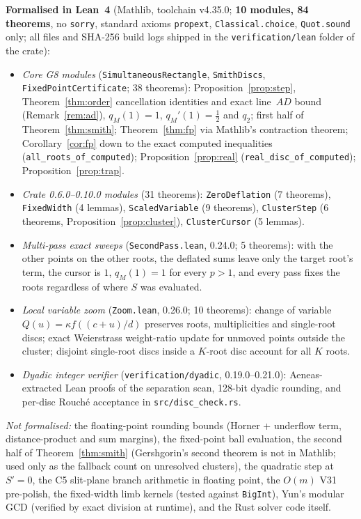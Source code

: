 \documentclass[10pt,a4paper]{article}
\theoremstyle{definition}
\numberwithin{equation}{section}
\begin{document}
\textbf{Formalised in Lean~4} (Mathlib, toolchain v4.35.0; \textbf{10 modules, 84 theorems}, no \texttt{sorry}, standard axioms \texttt{propext}, \texttt{Classical.choice}, \texttt{Quot.sound} only; all files and SHA-256 build logs shipped in the \texttt{verification/lean} folder of the crate):
\begin{itemize}
\item \emph{Core G8 modules} (\texttt{SimultaneousRectangle}, \texttt{SmithDiscs}, \texttt{FixedPointCertificate}; 38 theorems): Proposition~\ref{prop:step}, Theorem~\ref{thm:order} cancellation identities and exact line~$AD$ bound (Remark~\ref{rem:ad}), $q_M(1)=1$, $q_M'(1)=\frac12$ and $q_2$; first half of Theorem~\ref{thm:smith}; Theorem~\ref{thm:fp} via Mathlib's contraction theorem; Corollary~\ref{cor:fp} down to the exact computed inequalities (\texttt{all\_roots\_of\_computed}); Proposition~\ref{prop:real} (\texttt{real\_disc\_of\_computed}); Proposition~\ref{prop:trap}.
\item \emph{Crate 0.6.0--0.10.0 modules} (31 theorems): \texttt{ZeroDeflation} (7 theorems), \texttt{FixedWidth} (4 lemmas), \texttt{ScaledVariable} (9 theorems), \texttt{ClusterStep} (6 theorems, Proposition~\ref{prop:cluster}), \texttt{ClusterCursor} (5 lemmas).
\item \emph{Multi-pass exact sweeps} (\texttt{SecondPass.lean}, 0.24.0; 5 theorems): with the other points on the other roots, the deflated sums leave only the target root's term, the cursor is $1$, $q_M(1)=1$ for every $p>1$, and every pass fixes the roots regardless of where $S$ was evaluated.
\item \emph{Local variable zoom} (\texttt{Zoom.lean}, 0.26.0; 10 theorems): change of variable $Q(u)=\kappa f((c+u)/d)$ preserves roots, multiplicities and single-root discs; exact Weierstrass weight-ratio update for unmoved points outside the cluster; disjoint single-root discs inside a $K$-root disc account for all $K$ roots.
\item \emph{Dyadic integer verifier} (\texttt{verification/dyadic}, 0.19.0--0.21.0): Aeneas-extracted Lean proofs of the separation scan, 128-bit dyadic rounding, and per-disc Rouch\'e acceptance in \texttt{src/disc\_check.rs}.
\end{itemize}

\emph{Not formalised:} the floating-point rounding bounds (Horner + underflow term, distance-product and sum margins), the fixed-point ball evaluation, the second half of Theorem~\ref{thm:smith} (Gershgorin's second theorem is not in Mathlib; used only as the fallback count on unresolved clusters), the quadratic step at $S'=0$, the C5 slit-plane branch arithmetic in floating point, the $O(m)$ V31 pre-polish, the fixed-width limb kernels (tested against \texttt{BigInt}), Yun's modular GCD (verified by exact division at runtime), and the Rust solver code itself.
\end{document}

